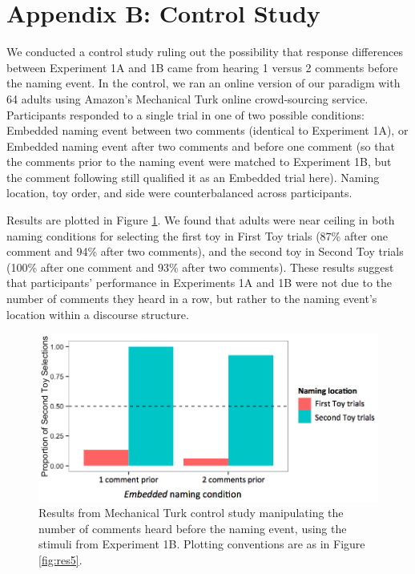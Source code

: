 \documentclass[man]{apa2}
\begin{document}
\section{Appendix B: Control Study}

We conducted a control study ruling out the possibility that response differences between Experiment 1A and 1B came from hearing 1 versus 2 comments before the naming event.  In the control, we ran an online version of our paradigm with 64 adults using Amazon's Mechanical Turk online crowd-sourcing service.  Participants responded to a single trial in one of two possible conditions: Embedded naming event between two comments (identical to Experiment 1A), or Embedded naming event after two comments and before one comment (so that the comments prior to the naming event were matched to Experiment 1B, but the comment following still qualified it as an Embedded trial here).  Naming location, toy order, and side were counterbalanced across participants. 

Results are plotted in Figure \ref{fig:control}. We found that adults were near ceiling in both naming conditions for selecting the first toy in First Toy trials (87\% after one comment and 94\% after two comments), and the second toy in Second Toy trials (100\% after one comment and 93\% after two comments).  These results suggest that participants' performance in Experiments 1A and 1B were not due to the number of comments they heard in a row, but rather to the naming event's location within a discourse structure.

\begin{figure}
  \begin{center} 
    \includegraphics[width=5in]{figures/continuity_turk_2and3comments.png} 
    \caption{\label{fig:control} Results from Mechanical Turk control study manipulating the number of comments heard before the naming event, using the stimuli from Experiment 1B. Plotting conventions are as in Figure \ref{fig:res5}.} 
  \end{center} 
\end{figure}
\end{document}
